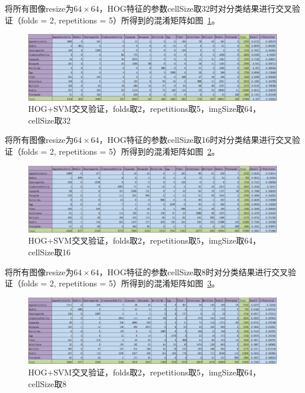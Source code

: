 \documentclass[12pt]{article}
\begin{document}
\begin{enumerate}
将所有图像resize为$64 \times 64$，HOG特征的参数cellSize取32时对分类结果进行交叉验证（folds = 2, repetitions = 5）所得到的混淆矩阵如图~\ref{fig: HOG-SVM-2-folds-5-repetitions-32-64}。
\begin{figure}[!ht]
\centering
\includegraphics[width=1.0\linewidth]{HOG-SVM-2-folds-5-repetitions-32-64}
\caption{HOG+SVM交叉验证，folds取2，repetitions取5，imgSize取64，cellSize取32}
\label{fig: HOG-SVM-2-folds-5-repetitions-32-64}
\end{figure}

将所有图像resize为$64 \times 64$，HOG特征的参数cellSize取16时对分类结果进行交叉验证（folds = 2, repetitions = 5）所得到的混淆矩阵如图~\ref{fig: HOG-SVM-2-folds-5-repetitions-16-64}。
\begin{figure}[!ht]
\centering
\includegraphics[width=1.0\linewidth]{HOG-SVM-2-folds-5-repetitions-16-64}
\caption{HOG+SVM交叉验证，folds取2，repetitions取5，imgSize取64，cellSize取16}
\label{fig: HOG-SVM-2-folds-5-repetitions-16-64}
\end{figure}

将所有图像resize为$64 \times 64$，HOG特征的参数cellSize取8时对分类结果进行交叉验证（folds = 2, repetitions = 5）所得到的混淆矩阵如图~\ref{fig: HOG-SVM-2-folds-5-repetitions-8-64}。
\begin{figure}[!ht]
\centering
\includegraphics[width=1.0\linewidth]{HOG-SVM-2-folds-5-repetitions-8-64}
\caption{HOG+SVM交叉验证，folds取2，repetitions取5，imgSize取64，cellSize取8}
\label{fig: HOG-SVM-2-folds-5-repetitions-8-64}
\end{figure}


\end{enumerate}
\end{document}
